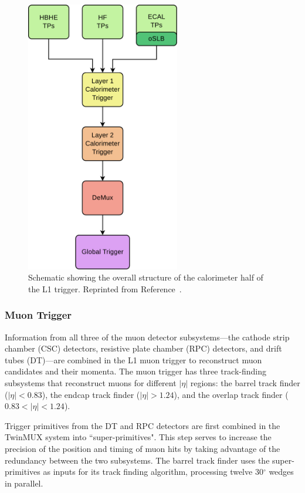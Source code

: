 \begin{figure}[h]
\begin{center}
\includegraphics[width=0.6\textwidth]{Figures/Trigger/caloL1T.pdf}
\end{center}
\caption{Schematic showing the overall structure of the calorimeter half of the L1 trigger. Reprinted from Reference~\cite{L1twiki}.}
\label{fig:caloL1T}
\end{figure}


\subsubsection{Muon Trigger}
Information from all three of the muon detector subsystems---the cathode strip chamber (CSC) detectors, resistive plate chamber (RPC) detectors, and drift tubes (DT)---are combined in the L1 muon trigger to reconstruct muon candidates and their momenta. The muon trigger has three track-finding subsystems that reconstruct muons for different $|\eta|$ regions: the barrel track finder ($|\eta| < 0.83$), the endcap track finder ($|\eta| > 1.24$), and the overlap track finder ($0.83 < |\eta| < 1.24$).

Trigger primitives from the DT and RPC detectors are first combined in the TwinMUX system into ``super-primitives". This step serves to increase the precision of the position and timing of muon hits by taking advantage of the redundancy between the two subsystems.  The barrel track finder uses the super-primitives as inputs for its track finding algorithm, processing twelve 30$^{\circ}$ wedges in parallel. 

